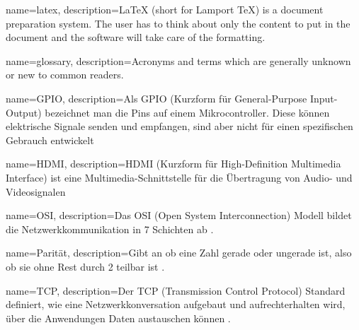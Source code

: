











{
	name=latex,
	description={LaTeX (short for Lamport TeX) is a document preparation system. The user has to think about only the content to put in the document and the software will take care of the formatting. }
}

{
	name=glossary,
	description={Acronyms and terms which are generally unknown or new to common readers.}
}

{
	name=GPIO,
	description={Als GPIO (Kurzform für General-Purpose Input-Output) bezeichnet man die Pins auf einem Mikrocontroller. Diese können elektrische Signale senden und empfangen, sind aber nicht für einen spezifischen Gebrauch entwickelt}
}

{
	name=HDMI,
	description={HDMI (Kurzform für High-Definition Multimedia Interface) ist eine Multimedia-Schnittstelle für die Übertragung von Audio- und Videosignalen}
}

{
	name=OSI,
	description={Das OSI (Open System Interconnection) Modell bildet die Netzwerkkommunikation in 7 Schichten ab \cite{Schnabel_osi:o.J.}.}
}

{
	name=Parität,
	description={Gibt an ob eine Zahl gerade oder ungerade ist, also ob sie ohne Rest durch 2 teilbar ist \cite{Parity_Mathematik:o.J.}.}
}

{
	name=TCP,
	description={Der TCP (Transmission Control Protocol) Standard definiert, wie eine Netzwerkkonversation aufgebaut und aufrechterhalten wird, über die Anwendungen Daten austauschen können \cite{Lutkevich:2021}.}
}

